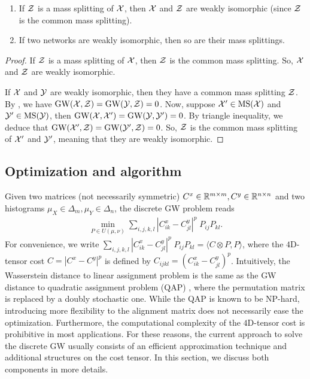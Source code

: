 \begin{corollary}
  \text{ }
\begin{enumerate}
  \item If $\mathcal Z$ is a mass splitting of $\mathcal X$, then $\mathcal X$ and $\mathcal Z$ are weakly isomorphic
  (since $\mathcal Z$ is the common mass splitting).
  \item If two networks are weakly isomorphic, then so are their mass splittings.
\end{enumerate}
\end{corollary}
\begin{proof}
  If $\mathcal Z$ is a mass splitting of $\mathcal X$, then $\mathcal Z$ is the common mass splitting.
  So, $\mathcal X$ and $\mathcal Z$ are weakly isomorphic.

  If $\mathcal X$ and $\mathcal Y$ are weakly isomorphic, then they have a common mass splitting $\mathcal Z$.
  By , we have $\text{GW}(\mathcal X, \mathcal Z) = \text{GW}(\mathcal Y, \mathcal Z) = 0$.
  Now, suppose $\mathcal X' \in \text{MS}(\mathcal X)$ and $\mathcal Y' \in \text{MS}(\mathcal Y)$, then
  $\text{GW}(\mathcal X, \mathcal X') = \text{GW}(\mathcal Y, \mathcal Y') = 0$. By triangle inequality, we deduce that
  $\text{GW}(\mathcal X', \mathcal Z) = \text{GW}(\mathcal Y', \mathcal Z) = 0$. So, $\mathcal Z$ is the common mass splitting
  of $\mathcal X'$ and $\mathcal Y'$, meaning that they are weakly isomorphic.
\end{proof}

\subsection{Optimization and algorithm}
Given two matrices (not necessarily symmetric)
$C^x \in \mathbb R^{m \times m}, C^y \in \mathbb R^{n \times n}$ and two histograms
$\mu_X \in \Delta_m, \mu_Y \in \Delta_n$, the discrete GW problem reads
\begin{align}
  \label{eq:discrete_gw}
  \min_{P \in U(\mu, \nu)} \sum_{i,j,k,l} |C^x_{ik} - C^y_{jl}|^p \; P_{ij} P_{kl}.
\end{align}
For convenience, we write
$\sum_{i,j,k,l} |C^x_{ik} - C^y_{jl}|^p \; P_{ij} P_{kl} = \langle C \otimes P, P \rangle$,
where the $4$D-tensor cost $C = |C^x - C^y|^p$ is defined by $C_{ijkl} = (C^x_{ik} - C^y_{jl})^p$.
Intuitively, the Wasserstein distance to linear assignment problem is
the same as the GW distance to quadratic assignment problem (QAP) \citep{Koopmans57},
where the permutation matrix is replaced by a doubly stochastic one.
While the QAP is known to be NP-hard, introducing more flexibility to the alignment matrix
does not necessarily ease the optimization. Furthermore,
the computational complexity of the $4$D-tensor cost is prohibitive in most applications.
For these reasons, the current approach to solve the discrete GW usually consists of
an efficient approximation technique and additional structures on the cost tensor.
In this section, we discuss both components in more details.

